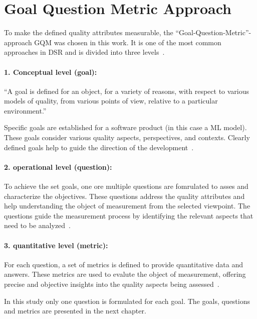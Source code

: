 \section{Goal Question Metric Approach}\label{subsec:goal-question-metric-approach}
To make the defined quality attributes measurable, the “Goal-Question-Metric”-approach \ac{GQM}
was chosen in this work.
It is one of the most common approaches in DSR and is divided into three levels~\cite[p. 3]{basili_goalquestionmetric_}.

\paragraph{1. Conceptual level (goal):}
``A goal is defined for an object, for a variety of reasons,
with respect to various models of quality, from various points of view, relative to a
particular environment.''~\cite[p. 3]{basili_goalquestionmetric_}

Specific goals are established for a software product (in this case a \ac{ML} model).
These goals consider various quality aspects, perspectives, and contexts.
Clearly defined goals help to guide the direction of the development~\cite[p. 3]{basili_goalquestionmetric_}.

\paragraph{2. operational level (question):}
To achieve the set goals, one ore multiple questions are fomrulated to asses and characterize the objectives.
These questions address the quality attributes and help understanding the object of measurement from the selected
viewpoint.
The questions guide the measurement process by identifying the relevant aspects that need to be
analyzed~\cite[p. 3]{basili_goalquestionmetric_}.

\paragraph{3. quantitative level (metric):}
For each question, a set of metrics is defined to provide quantitative data and answers.
These metrics are used to evalute the object of measurement, offering precise and objective insights into the
quality aspects being assessed~\cite[p. 3]{basili_goalquestionmetric_}.

In this study only one question is formulated for each goal.
The goals, questions and metrics are presented in the next chapter.
